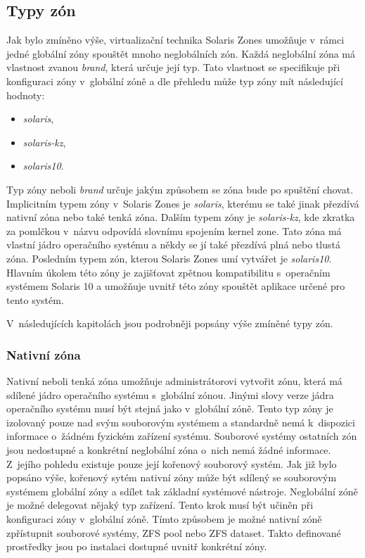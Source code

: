 \subsection{Typy zón}
\label{chapter:zones:types}
Jak bylo zmíněno výše, virtualizační technika Solaris Zones umožňuje v~rámci jedné globální zóny spouštět mnoho neglobálních
zón. Každá neglobální zóna má vlastnost zvanou \textit{brand}, která určuje její typ. Tato vlastnost se specifikuje
při konfiguraci zóny v~globální zóně a dle přehledu \cite{oracle:solaris:zones:brands} může typ zóny mít následující hodnoty:
\begin{itemize}
 \item \textit{solaris},
 \item \textit{solaris-kz},
 \item \textit{solaris10}.
\end{itemize}
Typ zóny neboli \textit{brand} určuje jakým způsobem se zóna bude po spuštění chovat. Implicitním typem zóny v~Solaris Zones
je \textit{solaris}, kterému se také jinak přezdívá nativní zóna nebo také tenká zóna. Dalším typem zóny je \textit{solaris-kz},
kde zkratka za pomlčkou v~názvu odpovídá slovnímu spojením kernel zone. Tato zóna má vlastní jádro
operačního systému a někdy se jí také přezdívá plná nebo tlustá zóna. Posledním typem zón, kterou Solaris Zones umí vytvářet
je \textit{solaris10}. Hlavním úkolem této zóny je zajišťovat zpětnou kompatibilitu s~operačním systémem Solaris 10 a umožňuje
uvnitř této zóny spouštět aplikace určené pro tento systém.

V~následujících kapitolách jsou podrobněji popsány výše zmíněné typy zón.
\subsubsection{Nativní zóna}
\label{chapter:zones:types:native}
Nativní neboli tenká zóna umožňuje administrátorovi vytvořit zónu, která má sdílené jádro operačního systému s~globální zónou.
Jinými slovy verze jádra operačního systému musí být stejná jako v~globální zóně. Tento typ zóny je izolovaný pouze nad svým
souborovým systémem a standardně nemá k~dispozici informace o~žádném fyzickém zařízení systému. Souborové systémy ostatních
zón jsou nedostupné a konkrétní neglobální zóna o~nich nemá žádné informace. Z~jejího pohledu existuje pouze její kořenový
souborový systém. Jak již bylo popsáno výše, kořenový sytém nativní zóny může být sdílený se souborovým systémem globální
zóny a sdílet tak základní systémové nástroje. Neglobální zóně je možné delegovat nějaký typ zařízení. Tento krok musí být
učiněn při konfiguraci zóny v~globální zóně. Tímto způsobem je možné nativní zóně zpřístupnit souborové systémy, ZFS pool nebo
ZFS dataset. Takto definované prostředky jsou po instalaci dostupné uvnitř konkrétní zóny.

